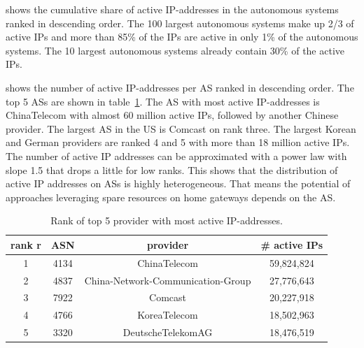  shows the cumulative share of active IP-addresses in the autonomous systems ranked in descending order.
The 100 largest autonomous systems make up 2/3 of active IPs and more than 85\% of the IPs are active in only 1\% of the autonomous systems. The 10 largest autonomous systems already contain 30\% of the active IPs.

 shows the number of active IP-addresses per AS ranked in descending order.
The top 5 ASs are shown in table~\ref{tab:asrank}.
The AS with most active IP-addresses is ChinaTelecom with almost 60 million active IPs, followed by another Chinese provider.
The largest AS in the US is Comcast on rank three.
The largest Korean and German providers are ranked 4 and 5 with more than 18 million active IPs.
The number of active IP addresses can be approximated with a power law with slope 1.5 that drops a little for low ranks.
This shows that the distribution of active IP addresses on ASs is highly heterogeneous.
That means the potential of approaches leveraging spare resources on home gateways depends on the AS.

\begin{table}[tb]
\centering
\caption{Rank of top 5 provider with most active IP-addresses.}
\label{tab:asrank}
\begin{tabular}{|c|c|c|c|}
\hline
rank r & ASN & provider & \# active IPs  \\
\hline
1 & 4134 & ChinaTelecom & 59,824,824 \\
2 & 4837 & China-Network-Communication-Group & 27,776,643 \\
3 & 7922 & Comcast & 20,227,918 \\
4 & 4766 & KoreaTelecom & 18,502,963 \\
5 & 3320 & DeutscheTelekomAG & 18,476,519 \\
\hline
\end{tabular}
\end{table}
%

%
%
%
